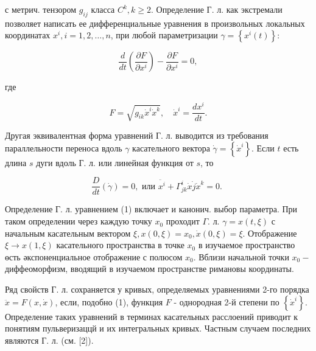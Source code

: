 \documentclass[10pt]{article}
\begin{document}
с метрич. тензором $g_{i j}$ класса $C^{k}, k \geqslant 2$. Определение Г. л. как экстремали позволяет написать ее дифференциальные уравнения в произвольных локальных координатах $x^{i}, i=1,2, \ldots, n$, при любой параметризации $\gamma=\left\{x^{i}(t)\right\}:$



\[

\frac{d}{d t}\left(\frac{\partial F}{\partial x^{i}}\right)-\frac{\partial F}{\partial x^{i}}=0,

\]



где



\[

F=\sqrt{g_{i k} \dot{x}^{i} \dot{x}^{k}}, \quad \dot{x}^{i}=\frac{d x^{i}}{d t} .

\]



Другая эквивалентная форма уравнений Г. л. выводится из требования параллельности переноса вдоль $\gamma$ касательного вектора $\dot{\gamma}=\left\{\dot{x}^{i}\right\}$. Если $t$ есть длина $s$ дуги вдоль Г. л. или линейная функция от $s$, то



\[

\frac{D}{d t}(\dot{\gamma})=0, \text { или } \ddot{x^{i}}+\Gamma_{j k}^{i} \dot{x} \dot{j} \dot{x}^{k}=0 \text {. }

\]



Определение Г. л. уравнением (1) включает и канонич. выбор параметра. При таком определении через каждую точку $x_{0}$ проходит $\Gamma$. л. $\gamma=x(t, \xi)$ с начальным касательным вектором $\xi, x(0, \xi)=x_{0}, \dot{x}(0, \xi)=\xi$. Отображение $\xi \rightarrow x(1, \xi)$ касательного пространства в точке $x_{0}$ в изучаемое пространство өсть әкспоненциальное отображение с полюсом $x_{0}$. Вблизи начальной точки $x_{0}-$ диффеоморфизм, вводящий в изучаемом пространстве римановы координаты.



Ряд свойств Г. л. сохраняется у кривых, определяемых уравнениями 2-го порядка $\ddot{x}=F(x, \dot{x})$, если, подобно (1), функция $F$ - однородная 2-й степени по $\left\{\dot{x}^{i}\right\}$. Определение таких уравнений в терминах касательных расслоений приводит к понятиям пульверизаццй и их интегральных кривых. Частным случаем последних являются Г. л. (см. [2]).
\end{document}
